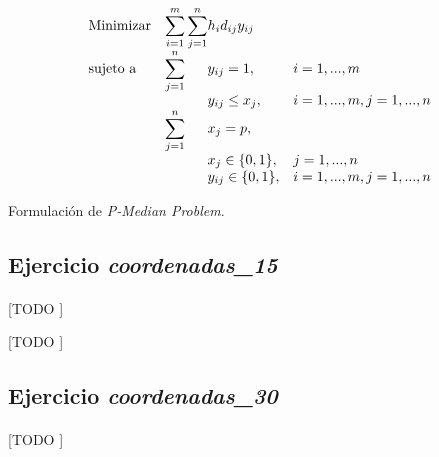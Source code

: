 \documentclass[spanish]{article}
\begin{document}
		\begin{eqfloat}
			\begin{equation}
				\begin{array}{ll@{}ll}
					\text{Minimizar}
						& \displaystyle\sum\limits_{i = 1}^m
							\displaystyle\sum\limits_{j = 1}^n	& h_i d_{ij} y_{ij}	&							\\
					\text{sujeto a}
						& \displaystyle\sum\limits_{j = 1}^n 	& y_{ij} = 1,		& i = 1,..., m	\\
						& 																	 	& y_{ij} \leq x_{j},  		& i=1 ,..., m,j=1 ,..., n  \\
						& \displaystyle\sum\limits_{j = 1}^n 	& x_{j} = p,  		& 						\\
						&                                     &	x_{j} \in \{0,1\},&j=1 ,..., n 	\\
						&                                     &	y_{ij} \in \{0,1\},&i=1 ,..., m, j=1 ,..., n  \\
				\end{array}
			\end{equation}
			\caption{Formulación de \emph{P-Median Problem}.}
      \label{eq:p_median}
    \end{eqfloat}


		\subsection{Ejercicio \emph{coordenadas\_15}}
		\label{sec:e-8a}

			\paragraph{}
			[TODO ]

			\begin{table}[p]
				\begin{center}
				\end{center}
				\caption{[TODO ]}
				\label{}
			\end{table}


		\subsection{Ejercicio \emph{coordenadas\_30}}
		\label{sec:e-8b}

			\paragraph{}
			[TODO ]
\end{document}
